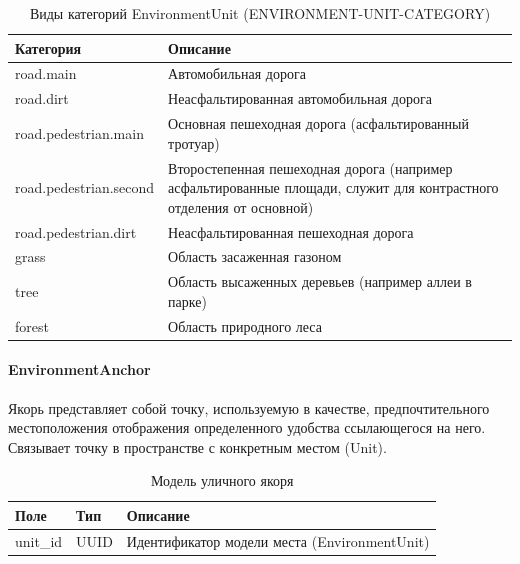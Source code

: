         \begin{center}
          \begin{xltabular}{\linewidth}{|l|X|}
            \caption{Виды категорий EnvironmentUnit (ENVIRONMENT-UNIT-CATEGORY)}\\ \hline
            Категория              & Описание                                                                                                            \\ \hline
            road.main              & Автомобильная дорога                                                                                                \\ \hline
            road.dirt              & Неасфальтированная автомобильная дорога                                                                             \\ \hline
            road.pedestrian.main   & Основная пешеходная дорога (асфальтированный тротуар)                                                               \\ \hline
            road.pedestrian.second & Второстепенная пешеходная дорога (например асфальтированные площади, служит для контрастного отделения от основной) \\ \hline
            road.pedestrian.dirt   & Неасфальтированная  пешеходная дорога                                                                               \\ \hline
            grass                  & Область засаженная газоном                                                                                          \\ \hline
            tree                   & Область высаженных деревьев (например аллеи в парке)                                                                \\ \hline
            forest                 & Область природного леса                                                                                             \\ \hline
          \end{xltabular}
        \end{center}

      \paragraph{EnvironmentAnchor}

        Якорь представляет собой точку, используемую в качестве, предпочтительного местоположения отображения определенного удобства ссылающегося на него. Связывает точку в пространстве с конкретным местом (Unit).
        \begin{center}
          \begin{xltabular}{\linewidth}{|l|p{4cm}|X|}
            \caption{Модель уличного якоря}\\\hline
            Поле     & Тип   & Описание                                     \\ \hline
            unit\_id & UUID  & Идентификатор модели места (EnvironmentUnit) \\ \hline
          \end{xltabular}
        \end{center}

